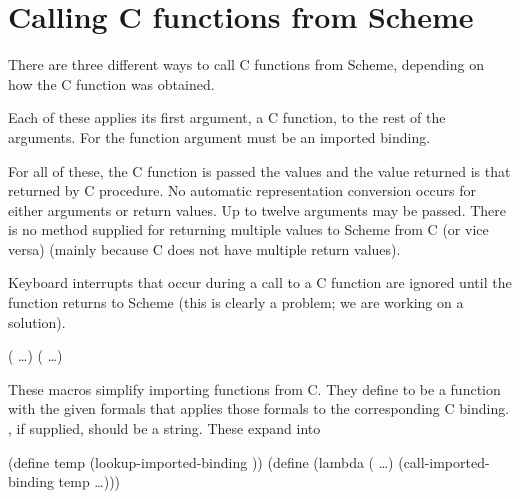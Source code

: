 \begin{protos}
\end{protos}

\section{Calling C functions from Scheme}
\label{sec:external-call}

There are three different ways to call C functions from Scheme, depending on
 how the C function was obtained.

\begin{protos}
\end{protos}
\noindent
Each of these applies its first argument, a C function, to the rest of
 the arguments.
For  the function argument must be an
 imported binding.

For all of these, the C function is passed the  values
 and the value returned is that returned by C procedure.
No automatic representation conversion occurs for either arguments or
 return values.
Up to twelve arguments may be passed.
There is no method supplied for returning multiple values to
 Scheme from C (or vice versa) (mainly because C does not have multiple return
 values).

Keyboard interrupts that occur during a call to a C function are ignored
 until the function returns to Scheme (this is clearly a
 problem; we are working on a solution).

\begin{protos}
{  ( \ldots)}
{  ( \ldots)\ }
\end{protos}
\noindent{}These macros simplify importing functions from C.
They define  to be a function with the given formals that
 applies those formals to the corresponding C binding.
, if supplied, should be a string.
These expand into

\begin{example}
(define temp (lookup-imported-binding ))
(define 
  (lambda ( \ldots)
    (call-imported-binding temp  \ldots)))
\end{example}

